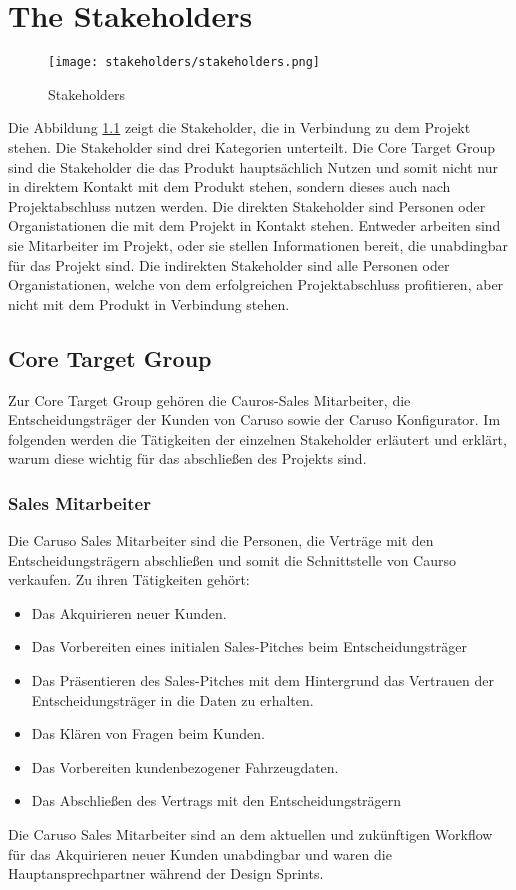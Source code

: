 \chapter{The Stakeholders}
\begin{figure}[ht]
  \centering
  \texttt{[image: stakeholders/stakeholders.png]}
  \caption{Stakeholders}
  \label{Kap2:Stakeholders}
\end{figure}
Die Abbildung \ref{Kap2:Stakeholders} zeigt die Stakeholder, die in Verbindung zu dem Projekt stehen. Die Stakeholder sind drei Kategorien unterteilt. Die Core Target Group sind die Stakeholder die das Produkt hauptsächlich Nutzen und somit nicht nur in direktem Kontakt mit dem Produkt stehen, sondern dieses auch nach Projektabschluss nutzen werden. Die direkten Stakeholder sind Personen oder Organistationen die mit dem Projekt in Kontakt stehen. Entweder arbeiten sind sie Mitarbeiter im Projekt, oder sie stellen Informationen bereit, die unabdingbar für das Projekt sind. Die indirekten Stakeholder sind alle Personen oder Organistationen, welche von dem erfolgreichen Projektabschluss profitieren, aber nicht mit dem Produkt in Verbindung stehen.
\section{Core Target Group}
Zur Core Target Group gehören die Cauros-Sales Mitarbeiter, die Entscheidungsträger der Kunden von Caruso sowie der Caruso Konfigurator. Im folgenden werden die Tätigkeiten der einzelnen Stakeholder erläutert und erklärt, warum diese wichtig für das abschließen des Projekts sind.

\subsection{Sales Mitarbeiter}
Die Caruso Sales Mitarbeiter sind die Personen, die Verträge mit den Entscheidungsträgern abschließen und somit die Schnittstelle von Caurso verkaufen. Zu ihren Tätigkeiten gehört:
\begin{itemize}
  \item Das Akquirieren neuer Kunden.
  \item Das Vorbereiten eines initialen Sales-Pitches beim Entscheidungsträger
  \item Das Präsentieren des Sales-Pitches mit dem Hintergrund das Vertrauen der Entscheidungsträger in die Daten zu erhalten.
  \item Das Klären von Fragen beim Kunden.
  \item Das Vorbereiten kundenbezogener Fahrzeugdaten.
  \item Das Abschließen des Vertrags mit den Entscheidungsträgern
\end{itemize}
Die Caruso Sales Mitarbeiter sind an dem aktuellen und zukünftigen Workflow für das Akquirieren neuer Kunden unabdingbar und waren die Hauptansprechpartner während der Design Sprints.

